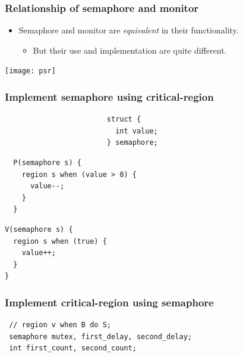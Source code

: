 \documentclass[CJKutf8,xcolor=pdftex,dvipsnames,table]{beamer}
\begin{document}
\begin{CJK*}{UTF8}{song}
\fi

  \begin{frame}
  \frametitle{Relationship of semaphore and monitor} \pause
  \begin{itemize}
  \item{Semaphore and monitor are \emph{equivalent} in their functionality.} \pause
    \begin{itemize}
    \item{But their use and implementation are quite different.} \pause
    \end{itemize}
  \end{itemize}
  \begin{center}
    \texttt{[image: psr]}
  \end{center}
  \end{frame}

\iffalse

  \begin{frame}[fragile]
  \frametitle{Implement semaphore using critical-region} \pause

\begin{lstlisting}
                        struct {
                          int value;
                        } semaphore;
\end{lstlisting} \pause
  \begin{minipage}[c]{0.5\textwidth}

\begin{lstlisting}
  P(semaphore s) {
    region s when (value > 0) {
      value--;
    }
  }
\end{lstlisting}

  \pause

\end{minipage}%
\begin{minipage}[c]{0.5\textwidth}

\begin{lstlisting}
V(semaphore s) {
  region s when (true) {
    value++;
  }
}
\end{lstlisting}

    \end{minipage}

\end{frame}

  \begin{frame}[fragile]
  \frametitle{Implement critical-region using semaphore} \pause

\begin{lstlisting}
 // region v when B do S;
 semaphore mutex, first_delay, second_delay;
 int first_count, second_count;
\end{lstlisting}
  \pause
  \begin{minipage}[c]{0.4\textwidth}


\end{minipage}
\end{frame}
\end{CJK*}
\end{document}
